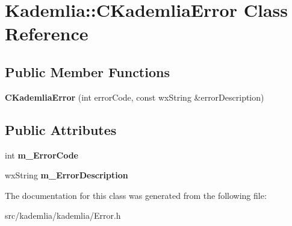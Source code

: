 \section{Kademlia::CKademliaError Class Reference}
\label{classKademlia_1_1CKademliaError}
\subsection*{Public Member Functions}
\begin{DoxyCompactItemize}
\item 
{\bfseries CKademliaError} (int errorCode, const wxString \&errorDescription)\label{classKademlia_1_1CKademliaError_a2c701ec748c494989df353c2381a6654}

\end{DoxyCompactItemize}
\subsection*{Public Attributes}
\begin{DoxyCompactItemize}
\item 
int {\bfseries m\_\-ErrorCode}\label{classKademlia_1_1CKademliaError_a1151e50e789f01abe25c9c20f0512050}

\item 
wxString {\bfseries m\_\-ErrorDescription}\label{classKademlia_1_1CKademliaError_aedb03ce467c4c4d7a0af6b430a5fc978}

\end{DoxyCompactItemize}


The documentation for this class was generated from the following file:\begin{DoxyCompactItemize}
\item 
src/kademlia/kademlia/Error.h\end{DoxyCompactItemize}

